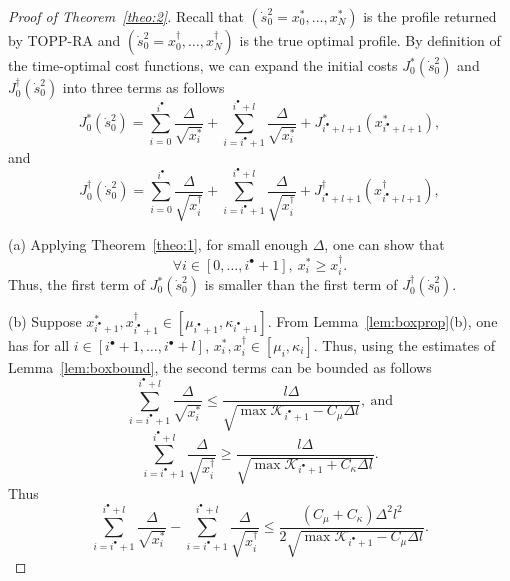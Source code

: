 \documentclass[journal]{IEEEtran}
\theoremstyle{plain}
\theoremstyle{definition}
\theoremstyle{definition}
\begin{document}
\begin{proof}[Proof of Theorem~\ref{theo:2}]

  Recall that $(\dot s_0^2=x^*_0, \dots, x^*_N)$ is the profile
  returned by TOPP-RA and
  $(\dot s_0^2 = x^\dagger_0, \dots, x^\dagger_N)$ is the true optimal
  profile. By definition of the time-optimal cost functions, we can
  expand the initial costs $J_0^*(\dot{s}_0^2)$ and
  $J_0^\dagger(\dot{s}_0^2)$ into three terms as follows
  \begin{equation}
    \label{eq:vstar}
    J_0^*(\dot{s}_0^2) =
    \sum_{i=0}^{i^\bullet}\frac{\Delta}{\sqrt{x_i^*}} + 
    \sum_{i=i^\bullet+1}^{i^\bullet+l}\frac{\Delta}{\sqrt{x_i^*}}
    + J_{i^\bullet+l+1}^*(x_{i^\bullet + l+1}^*),
  \end{equation}
  and 
  \begin{equation}
    \label{eq:vdagger}
    J_0^\dagger(\dot{s}_0^2) =
    \sum_{i=0}^{i^\bullet}\frac{\Delta}{\sqrt{x_i^\dagger}} + 
    \sum_{i=i^\bullet+1}^{i^\bullet+l}\frac{\Delta}{\sqrt{x_i^\dagger}}
    + J_{i^\bullet+l+1}^\dagger(x_{i^\bullet + l+1}^\dagger),
  \end{equation}

  (a) Applying Theorem~\ref{theo:1}, for small enough $\Delta$, one can
  show that
  \begin{equation}
    \label{eq:8}
    \forall i \in [0, \dots, i^\bullet+1],\ x^*_i \geq x^\dagger_i.
  \end{equation}
  Thus, the first term of $J_0^*(\dot{s}_0^2)$ is smaller
  than the first term of $J_0^\dagger(\dot{s}_0^2)$.

  (b) Suppose
  $x^{*}_{i^{\bullet}+1}, x^{\dagger}_{i^{\bullet}+1} \in [\mu_{i^\bullet+1},
  \kappa_{i^\bullet+1}]$. From Lemma~\ref{lem:boxprop}(b), one has for all
  $i\in[i^\bullet + 1, \dots, i^\bullet + l]$,
  $x^*_i,x^\dagger_i\in [\mu_i , \kappa_i]$. Thus, using the estimates
  of Lemma~\ref{lem:boxbound}, the second terms can be bounded as follows 
  \[
  \sum_{i=i^\bullet+1}^{i^\bullet+l}\frac{\Delta}{\sqrt{x_i^*}}
  \leq \frac{l\Delta}{\sqrt{\max\mathcal{K}_{i^\bullet+1} -
      C_\mu\Delta l}},\ \mathrm{and}
  \]
  \[
  \sum_{i=i^\bullet+1}^{i^\bullet+l}\frac{\Delta}{\sqrt{x_i^\dagger}}
  \geq \frac{l\Delta}{\sqrt{\max\mathcal{K}_{i^\bullet+1} +
      C_\kappa\Delta l}}.
  \]
  Thus
  \[
 \sum_{i=i^\bullet+1}^{i^\bullet+l}\frac{\Delta}{\sqrt{x_i^*}} -
 \sum_{i=i^\bullet+1}^{i^\bullet+l}\frac{\Delta}{\sqrt{x_i^\dagger}}
 \leq
 \frac{(C_\mu+C_\kappa) \Delta^2l^2}{2\sqrt{\max \mathcal{K}_{i^\bullet+1} - C_\mu\Delta l}}.
  \]



\end{proof}
\end{document}
